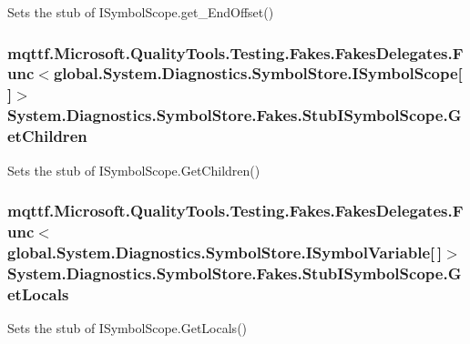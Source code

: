 Sets the stub of I\-Symbol\-Scope.\-get\-\_\-\-End\-Offset()

\hypertarget{class_system_1_1_diagnostics_1_1_symbol_store_1_1_fakes_1_1_stub_i_symbol_scope_a2e37a64c905c4111c3330afecbea4896}{
\subsubsection[{Get\-Children}]{\setlength{\rightskip}{0pt plus 5cm}mqttf.\-Microsoft.\-Quality\-Tools.\-Testing.\-Fakes.\-Fakes\-Delegates.\-Func$<$global.\-System.\-Diagnostics.\-Symbol\-Store.\-I\-Symbol\-Scope\mbox{[}$\,$\mbox{]}$>$ System.\-Diagnostics.\-Symbol\-Store.\-Fakes.\-Stub\-I\-Symbol\-Scope.\-Get\-Children}}\label{class_system_1_1_diagnostics_1_1_symbol_store_1_1_fakes_1_1_stub_i_symbol_scope_a2e37a64c905c4111c3330afecbea4896}


Sets the stub of I\-Symbol\-Scope.\-Get\-Children()

\hypertarget{class_system_1_1_diagnostics_1_1_symbol_store_1_1_fakes_1_1_stub_i_symbol_scope_abcd271e24b26a33940d3fdd244bc8e5a}{
\subsubsection[{Get\-Locals}]{\setlength{\rightskip}{0pt plus 5cm}mqttf.\-Microsoft.\-Quality\-Tools.\-Testing.\-Fakes.\-Fakes\-Delegates.\-Func$<$global.\-System.\-Diagnostics.\-Symbol\-Store.\-I\-Symbol\-Variable\mbox{[}$\,$\mbox{]}$>$ System.\-Diagnostics.\-Symbol\-Store.\-Fakes.\-Stub\-I\-Symbol\-Scope.\-Get\-Locals}}\label{class_system_1_1_diagnostics_1_1_symbol_store_1_1_fakes_1_1_stub_i_symbol_scope_abcd271e24b26a33940d3fdd244bc8e5a}


Sets the stub of I\-Symbol\-Scope.\-Get\-Locals()

